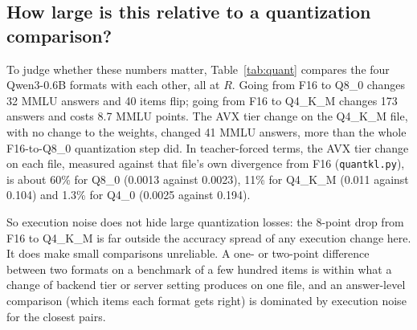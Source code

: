 \subsection{How large is this relative to a quantization comparison?}
To judge whether these numbers matter, Table~\ref{tab:quant} compares the four Qwen3-0.6B
formats with each other, all at $R$. Going from F16 to Q8\_0 changes 32 MMLU answers and 40 items
flip; going from F16 to Q4\_K\_M changes 173 answers and costs 8.7 MMLU points. The AVX tier change
on the Q4\_K\_M file, with no change to the weights, changed 41 MMLU answers, more than the whole
F16-to-Q8\_0 quantization step did. In teacher-forced terms, the AVX tier change on each file, measured against that file's own
divergence from F16 (\texttt{quantkl.py}), is about 60\% for Q8\_0 (0.0013 against 0.0023), 11\%
for Q4\_K\_M (0.011 against 0.104) and 1.3\% for Q4\_0 (0.0025 against 0.194).

So execution noise does not hide large quantization losses: the 8-point drop from F16 to
Q4\_K\_M is far outside the accuracy spread of any execution change here. It does make small
comparisons unreliable. A one- or two-point difference between two formats on a benchmark of a
few hundred items is within what a change of backend tier or server setting produces on one
file, and an answer-level comparison (which items each format gets right) is dominated by
execution noise for the closest pairs.

\begin{table}[t]
\centering\small
\caption{Differences between quantization formats of the same model, all run at $R$.
Compare with the execution-only differences in Table~\ref{tab:evalfull}.}
\label{tab:quant}

\end{table}
